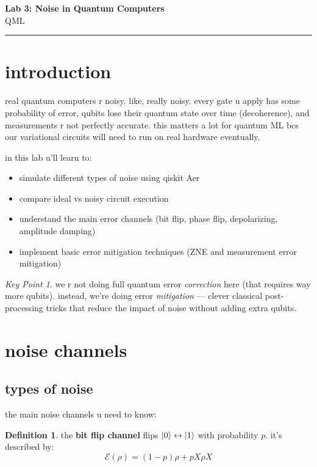 \documentclass[11pt,a4paper]{article}
\theoremstyle{definition}
\newtheorem{definition}{Definition}[section]
\theoremstyle{remark}
\newtheorem*{keypoint}{Key Point}
\begin{document}
{\LARGE \textbf{Lab 3: Noise in Quantum Computers}}\\[8pt]
{\large QML}\\[12pt]
\hrule

\vspace{16pt}

\section{introduction}

real quantum computers r noisy. like, really noisy. every gate u apply has some probability of error, qubits lose their quantum state over time (decoherence), and measurements r not perfectly accurate. this matters a lot for quantum ML bcs our variational circuits will need to run on real hardware eventually.

in this lab u'll learn to:
\begin{itemize}[leftmargin=*]
  \item simulate different types of noise using qiskit Aer
  \item compare ideal vs noisy circuit execution
  \item understand the main error channels (bit flip, phase flip, depolarizing, amplitude damping)
  \item implement basic error mitigation techniques (ZNE and measurement error mitigation)
\end{itemize}

\begin{keypoint}
we r not doing full quantum error \textit{correction} here (that requires way more qubits). instead, we're doing error \textit{mitigation} --- clever classical post-processing tricks that reduce the impact of noise without adding extra qubits.
\end{keypoint}

\section{noise channels}

\subsection{types of noise}

the main noise channels u need to know:

\begin{definition}
the \textbf{bit flip channel} flips $\ket{0} \leftrightarrow \ket{1}$ with probability $p$. it's described by:
\[
\mathcal{E}(\rho) = (1-p)\rho + p X\rho X
\]
\end{definition}
\end{document}
